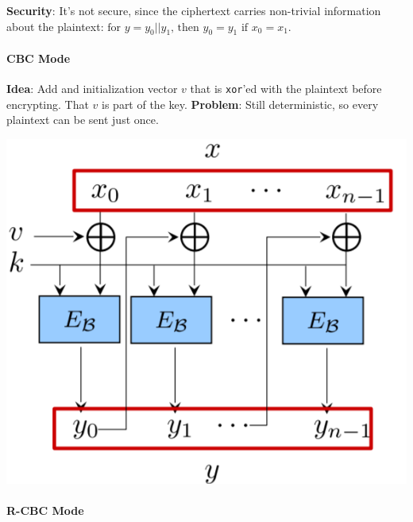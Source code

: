 \textbf{Security}: It's not secure, since the ciphertext carries
non-trivial information about the plaintext:
\(\text{for } y = y_0 || y_1\text{, then } y_0 = y_1 \text{ if } x_0 = x_1\).

\hypertarget{cbc-mode}{%
\paragraph{CBC Mode}\label{cbc-mode}}

\begin{minipage}{.55\linewidth}

\textbf{Idea}: Add and initialization vector \(v\) that is
\texttt{xor}'ed with the plaintext before encrypting. That \(v\) is part
of the key. \newline\newline \textbf{Problem}: Still deterministic, so
every plaintext can be sent just once.

\end{minipage}\hfill
\begin{minipage}{.4\linewidth}
    \includegraphics[width=\linewidth]{img/cbc-mode}
\end{minipage}

\hypertarget{r-cbc-mode}{%
\paragraph{R-CBC Mode}\label{r-cbc-mode}}

